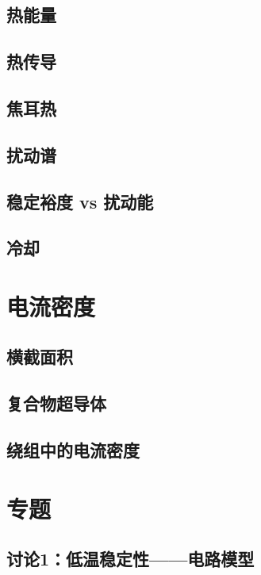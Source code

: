 \subsection{热能量}

\subsection{热传导}

\subsection{焦耳热}

\subsection{扰动谱}

\subsection{稳定裕度 vs 扰动能}

\subsection{冷却}

\section{电流密度}

\subsection{横截面积}

\subsection{复合物超导体}

\subsection{绕组中的电流密度}


\section{专题}
\subsection{讨论1：低温稳定性——电路模型}

